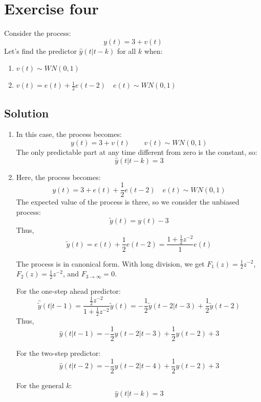 \section{Exercise four}

Consider the process: 
\[y(t)=3+v(t)\]
Let's find the predictor $\hat{y}(t|t-k)$ for all $k$ when: 
\begin{enumerate}
    \item $v(t)\sim WN(0,1)$
    \item $v(t)=e(t)+\frac{1}{2}e(t-2)\quad e(t)\sim WN(0,1)$
\end{enumerate}

\subsection*{Solution}
\begin{enumerate}
    \item In this case, the process becomes:
        \[y(t)=3+v(t) \qquad v(t)\sim WN(0,1)\]
        The only predictable part at any time different from zero is the constant, so:
        \[\hat{y}(t|t-k)=3\]
    \item Here, the process becomes:
        \[y(t)=3+e(t)+\frac{1}{2}e(t-2)\quad e(t)\sim WN(0,1)\]
        The expected value of the process is three, so we consider the unbiased process:
        \[\tilde{y}(t)=y(t)-3\]
        Thus,
        \[\tilde{y}(t)=e(t)+\frac{1}{2}e(t-2)=\dfrac{1+\frac{1}{2}z^{-2}}{1}e(t)\]

        The process is in canonical form. 
        With long division, we get $F_1(z)=\frac{1}{2}z^{-2}$, $F_2(z)=\frac{1}{2}z^{-2}$, and $F_{3\rightarrow\infty}=0$. 

        For the one-step ahead predictor: 
        \[\hat{\tilde{y}}(t|t-1)=\dfrac{\frac{1}{2}z^{-2}}{1+\frac{1}{2}z^{-2}}\tilde{y}(t)=-\dfrac{1}{2}\tilde{y}(t-2|t-3)+\dfrac{1}{2}\tilde{y}(t-2)\]
        Thus, 
        \[\hat{y}(t|t-1)=-\dfrac{1}{2}y(t-2|t-3)+\dfrac{1}{2}y(t-2)+3\]

        For the two-step predictor: 
        \[\hat{y}(t|t-2)=-\dfrac{1}{2}y(t-2|t-4)+\dfrac{1}{2}y(t-2)+3\]

        For the general $k$: 
        \[\hat{y}(t|t-k)=3\]
\end{enumerate}